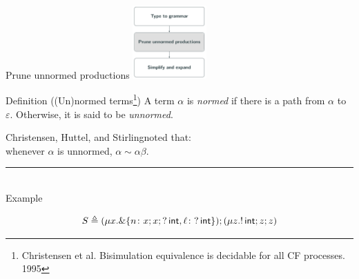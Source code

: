 \documentclass[10pt]{beamer}
\begin{document}
\begin{frame} {Prune unnormed productions}
	\hfill\includegraphics[height=2.8cm]{img/prune.png}

	\vspace*{-3cm}
	\begin{varblock}[7.8cm]{Definition ((Un)normed terms\footnote{\label{note1} Christensen et al. Bisimulation equivalence is decidable for all CF processes. 1995})}
		\smallskip 
		A term $\alpha$ is \emph{normed} if there is a path from $\alpha$ to $\varepsilon$. Otherwise, it is said to be \emph{unnormed}.
	\end{varblock}

	Christensen, Huttel, and Stirling\footnotemark[\value{footnote}] noted that:\\\smallskip
	\hspace*{1cm}	whenever $\alpha$ is unnormed, $\alpha \sim \alpha \beta$.

	\pause
	\vspace*{-1mm}
	{\color{teal}\rule{3cm}{2pt}}\\
   	{\color{teal} Example} \\\smallskip
	\vspace*{-7mm}

	$$S \triangleq (\mu x. \&\{n\colon x;x;?\,\mathsf{int},
      \ell\colon ?\,\mathsf{int} \});( \mu z. !\,\mathsf{int}; z;z )$$


\end{frame}
\end{document}
